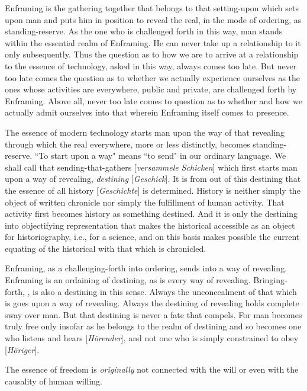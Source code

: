 Enframing is the gathering together that belongs to that setting-upon which sets upon man and puts him in position to reveal the real, in the mode of ordering, as standing-reserve. As the one who is challenged forth in this way, man stands within the essential realm of Enframing. He can never take up a relationship to it only subsequently. Thus the question as to how we are to arrive at a relationship to the essence of technology, asked in this way, always comes too late. But never too late comes the question as to whether we actually experience ourselves as the ones whose activities are everywhere, public and private, are challenged forth by Enframing. Above all, never too late comes to question as to whether and how we actually admit ourselves into that wherein Enframing itself comes to presence.

The essence of modern technology starts man upon the way of that revealing through which the real everywhere, more or less distinctly, becomes standing-reserve. ``To start upon a way" means ``to send" in our ordinary language. We shall call that sending-that-gathers [\textit{versammele Schicken}] which first starts man upon a way of revealing, \textit{destining} [\textit{Geschick}]. It is from out of this destining that the essence of all history [\textit{Geschichte}] is determined. History is neither simply the object of written chronicle nor simply the fulfillment of human activity. That activity first becomes history as something destined. And it is only the destining into objectifying representation that makes the historical accessible as an object for historiography, i.e., for a science, and on this basis makes possible the current equating of the historical with that which is chronicled.

Enframing, as a challenging-forth into ordering, sends into a way of revealing. Enframing is an ordaining of destining, as is every way of revealing. Bringing-forth, , is also a destining in this sense. Always the unconcealment of that which is goes upon a way of revealing. Always the destining of revealing holds complete sway over man. But that destining is never a fate that compels. For man becomes truly free only insofar as he belongs to the realm of destining and so becomes one who listens and hears [\textit{H\"{o}render}], and not one who is simply constrained to obey [\textit{H\"{o}riger}].

The essence of freedom is \textit{originally} not connected with the will or even with the causality of human willing.

